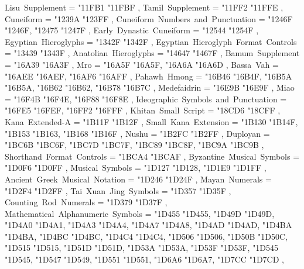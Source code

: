 {    Lisu~Supplement                                = { {"11FB1} {"11FBF} },
    Tamil~Supplement                               = { {"11FF2} {"11FFE} },
    Cuneiform                                      = { {"1239A} {"123FF} },
    Cuneiform~Numbers~and~Punctuation              = { {"1246F} {"1246F}, {"12475} {"1247F} },
    Early~Dynastic~Cuneiform                       = { {"12544} {"1254F} },
    Egyptian~Hieroglyphs                           = { {"1342F} {"1342F} },
    Egyptian~Hieroglyph~Format~Controls            = { {"13439} {"1343F} },
    Anatolian~Hieroglyphs                          = { {"14647} {"1467F} },
    Bamum~Supplement                               = { {"16A39} {"16A3F} },
    Mro                                            = { {"16A5F} {"16A5F}, {"16A6A} {"16A6D} },
    Bassa~Vah                                      = { {"16AEE} {"16AEF}, {"16AF6} {"16AFF} },
    Pahawh~Hmong                                   = { {"16B46} {"16B4F}, {"16B5A} {"16B5A}, {"16B62} {"16B62}, {"16B78} {"16B7C} },
    Medefaidrin                                    = { {"16E9B} {"16E9F} },
    Miao                                           = { {"16F4B} {"16F4E}, {"16F88} {"16F8E} },
    Ideographic~Symbols~and~Punctuation            = { {"16FE5} {"16FEF}, {"16FF2} {"16FFF} },
    Khitan~Small~Script                            = { {"18CD6} {"18CFF} },
    Kana~Extended-A                                = { {"1B11F} {"1B12F} },
    Small~Kana~Extension                           = { {"1B130} {"1B14F}, {"1B153} {"1B163}, {"1B168} {"1B16F} },
    Nushu                                          = { {"1B2FC} {"1B2FF} },
    Duployan                                       = { {"1BC6B} {"1BC6F}, {"1BC7D} {"1BC7F}, {"1BC89} {"1BC8F}, {"1BC9A} {"1BC9B} },
    Shorthand~Format~Controls                      = { {"1BCA4} {"1BCAF} },
    Byzantine~Musical~Symbols                      = { {"1D0F6} {"1D0FF} },
    Musical~Symbols                                = { {"1D127} {"1D128}, {"1D1E9} {"1D1FF} },
    Ancient~Greek~Musical~Notation                 = { {"1D246} {"1D24F} },
    Mayan~Numerals                                 = { {"1D2F4} {"1D2FF} },
    Tai~Xuan~Jing~Symbols                          = { {"1D357} {"1D35F} },
    Counting~Rod~Numerals                          = { {"1D379} {"1D37F} },
    Mathematical~Alphanumeric~Symbols              = { {"1D455} {"1D455}, {"1D49D} {"1D49D}, {"1D4A0} {"1D4A1}, {"1D4A3} {"1D4A4}, {"1D4A7} {"1D4A8}, {"1D4AD} {"1D4AD}, {"1D4BA} {"1D4BA}, {"1D4BC} {"1D4BC}, {"1D4C4} {"1D4C4}, {"1D506} {"1D506}, {"1D50B} {"1D50C}, {"1D515} {"1D515}, {"1D51D} {"1D51D}, {"1D53A} {"1D53A}, {"1D53F} {"1D53F}, {"1D545} {"1D545}, {"1D547} {"1D549}, {"1D551} {"1D551}, {"1D6A6} {"1D6A7}, {"1D7CC} {"1D7CD} },
}
